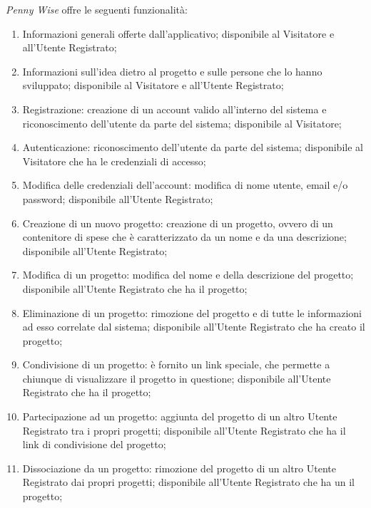 \textit{Penny Wise} offre le seguenti funzionalità:
\begin{enumerate}
    \item Informazioni generali offerte dall'applicativo; disponibile al Visitatore e all'Utente Registrato;

    \item Informazioni sull'idea dietro al progetto e sulle persone che lo hanno sviluppato; disponibile al Visitatore e all'Utente Registrato;

    \item Registrazione: creazione di un account valido all'interno del sistema e riconoscimento dell'utente da parte del sistema; disponibile al Visitatore;

    \item Autenticazione: riconoscimento dell'utente da parte del sistema; disponibile al Visitatore che ha le credenziali di accesso;

    \item Modifica delle credenziali dell'account: modifica di nome utente, email e/o password; disponibile all'Utente Registrato;

    \item Creazione di un nuovo progetto: creazione di un progetto, ovvero di un contenitore di spese che è caratterizzato da un nome e da una descrizione; disponibile all'Utente Registrato;

    \item Modifica di un progetto: modifica del nome e della descrizione del progetto; disponibile all'Utente Registrato che ha il progetto;

    \item Eliminazione di un progetto: rimozione del progetto e di tutte le informazioni ad esso correlate dal sistema; disponibile all'Utente Registrato che ha creato il progetto;

    \item Condivisione di un progetto: è fornito un link speciale, che permette a chiunque di visualizzare il progetto in questione; disponibile all'Utente Registrato che ha il progetto;

    \item Partecipazione ad un progetto: aggiunta del progetto di un altro Utente Registrato tra i propri progetti; disponibile all'Utente Registrato che ha il link di condivisione del progetto;

    \item Dissociazione da un progetto: rimozione del progetto di un altro Utente Registrato dai propri progetti; disponibile all'Utente Registrato che ha un il progetto;


\end{enumerate}
